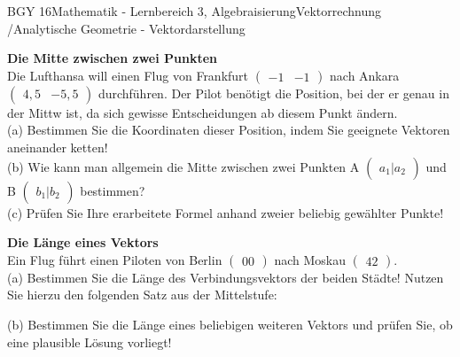 \documentclass[oneside,openany,headings=optiontotoc,11pt,numbers=noenddot]{scrreprt}
\begin{document}
\begin{worksheet}{BGY 16}{Mathematik - Lernbereich 3, Algebraisierung}{Vektorrechnung /Analytische Geometrie - Vektordarstellung}
\begin{framed}
			\par
			\bigskip
			\noindent
			\textbf{Die Mitte zwischen zwei Punkten}\\
			Die Lufthansa will einen Flug von Frankfurt \(\begin{pmatrix}-1 & -1\end{pmatrix}\) nach Ankara \(\begin{pmatrix}4,5 & -5,5\end{pmatrix}\) durchführen. Der Pilot benötigt die Position, bei der er genau in der Mittw ist, da sich gewisse Entscheidungen ab diesem Punkt ändern.\\
			(a) Bestimmen Sie die Koordinaten dieser Position, indem Sie geeignete Vektoren aneinander ketten!\\
			(b) Wie kann man allgemein die Mitte zwischen zwei Punkten A \(\begin{pmatrix}a_{1} | a_{2}\end{pmatrix}\) und B \(\begin{pmatrix}b_{1}|b_{2}\end{pmatrix}\) bestimmen?\\
			(c) Prüfen Sie Ihre erarbeitete Formel anhand zweier beliebig gewählter Punkte!\\
			\par
			\bigskip
			\noindent
			\textbf{Die Länge eines Vektors}\\
			Ein Flug führt einen Piloten von Berlin \(\begin{pmatrix}0 0\end{pmatrix}\) nach Moskau \(\begin{pmatrix}4 2\end{pmatrix}\).\\
			(a) Bestimmen Sie die Länge des Verbindungsvektors der beiden Städte! Nutzen Sie hierzu den folgenden Satz aus der Mittelstufe:\\
			\begin{framed}
			\end{framed}
			\noindent
			(b) Bestimmen Sie die Länge eines beliebigen weiteren Vektors und prüfen Sie, ob eine plausible Lösung vorliegt!
		\end{framed}
	\end{worksheet}
\end{document}
